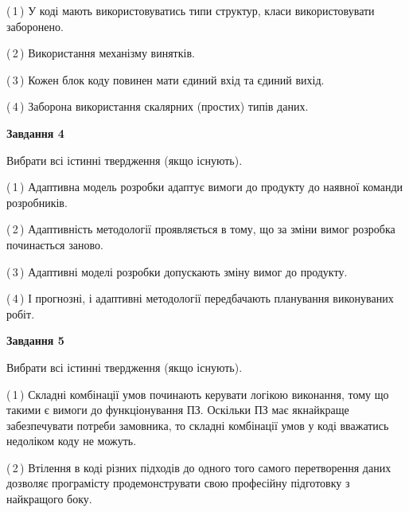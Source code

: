 \documentclass[10pt, ukrainian]{article}
\begin{document}
{\begin {large}
(\,1\,) У коді мають використовуватись типи структур, класи використовувати заборонено. %



(\,2\,) Використання механізму винятків. %



(\,3\,) Кожен блок коду повинен мати єдиний вхід та єдиний вихід.%



(\,4\,) Заборона використання скалярних (простих) типів даних. %


{\begin {center}\textbf{Завдання 4}\end {center}}\par
Вибрати всі істинні твердження (якщо існують).\par
\vspace{2mm}



(\,1\,) Адаптивна модель розробки адаптує вимоги до продукту до наявної команди розробників. %



(\,2\,) Адаптивність методології проявляється в тому, що за зміни вимог розробка починається заново. %



(\,3\,) Адаптивні моделі розробки допускають зміну вимог до продукту. %



(\,4\,) І прогнозні, і адаптивні методології передбачають планування виконуваних робіт. %


{\begin {center}\textbf{Завдання 5}\end {center}}\par
Вибрати всі істинні твердження (якщо існують).\par
\vspace{2mm}



(\,1\,) Складні комбінації умов починають керувати логікою виконання, тому що такими є вимоги до функціонування ПЗ. Оскільки ПЗ має якнайкраще забезпечувати потреби замовника, то складні комбінації умов у коді вважатись недоліком коду не можуть. %



(\,2\,) Втілення в коді різних підходів до одного того самого перетворення даних дозволяє програмісту продемонструвати свою професійну підготовку з найкращого боку. %




\end{large}}
\end{document}

